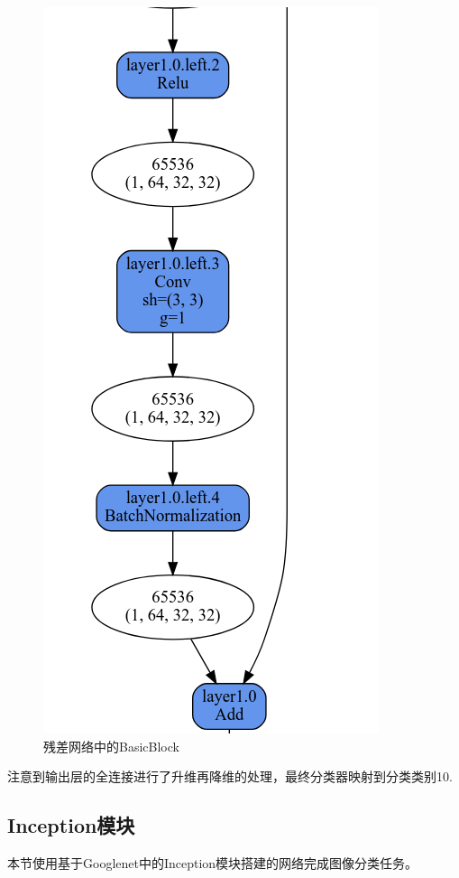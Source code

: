 \documentclass[UTF8]{ctexart}
\begin{document}
\begin{figure}[H]
    \includegraphics[scale=0.3]{../images/resblock2.png}
    \caption{残差网络中的BasicBlock}
\end{figure}

注意到输出层的全连接进行了升维再降维的处理，最终分类器映射到分类类别10.

\subsection{Inception模块}

本节使用基于Googlenet中的Inception模块搭建的网络完成图像分类任务。
\end{document}
